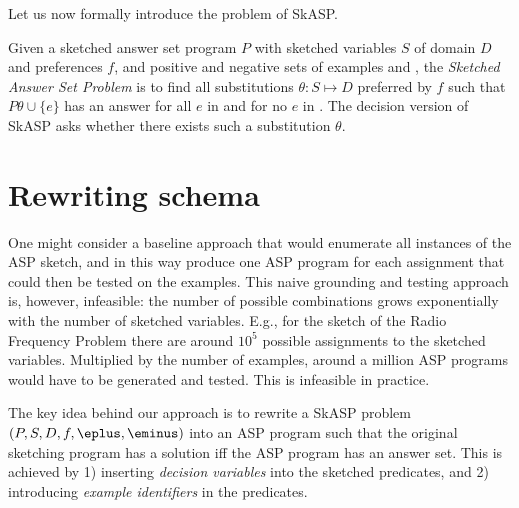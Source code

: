 Let us now formally introduce the problem of SkASP.
\begin{definition}
  Given  a sketched answer set program $P$ with sketched variables $S$ of domain $D$ and preferences $f$, and positive and negative sets of examples \eplus and \eminus, the \emph{Sketched Answer Set Problem} is to find all substitutions $\theta:S\mapsto D$ preferred by $f$ such that $P\theta \cup \{e\}$ has an answer for all $e$ in \eplus and for no $e$ in \eminus. 
%
The decision version 
of SkASP  asks whether there exists such a substitution $\theta$.
\end{definition}

\section{Rewriting schema}\label{sec:method}
One might consider a baseline approach that would enumerate all instances of the ASP sketch, and in this way produce
one ASP program for each assignment that could then be tested on the examples. 
This naive grounding and testing approach is, however, infeasible: the number of possible combinations grows exponentially with the number of sketched variables. E.g., for the sketch of the Radio Frequency Problem \parencite{fap} there are around $10^5$ possible assignments to the sketched variables. Multiplied by the number of examples, around a million ASP programs would have to be generated and tested. This is  infeasible in practice.   



The key idea behind our approach is to rewrite a SkASP problem $(P,S,D,f,\eplus,\eminus)$ into an ASP program such that the original sketching program has a solution iff the ASP program has an answer set. 
This is achieved by 1) inserting \textit{decision variables} into the sketched predicates,
and 2) introducing {\em example identifiers} in the predicates. 

